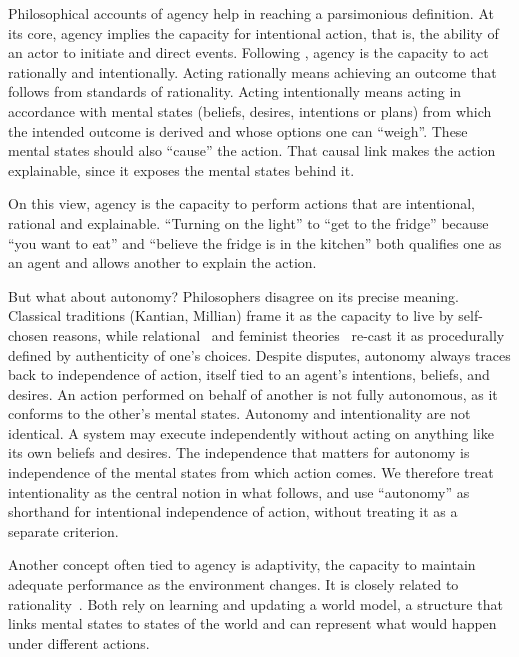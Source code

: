 \documentclass[letterpaper]{article} %
\theoremstyle{definition}
\begin{document}
Philosophical accounts of agency help in reaching a parsimonious definition. At its core, agency implies the capacity for intentional action, that is, the ability of an actor to initiate and direct events. Following \citet{davidsonEssaysActionsEvents1980}, agency is the capacity to act rationally and intentionally. Acting rationally means achieving an outcome that follows from standards of rationality. Acting intentionally means acting in accordance with mental states (beliefs, desires, intentions or plans) from which the intended outcome is derived and whose options one can ``weigh''. These mental states should also ``cause'' the action. That causal link makes the action explainable, since it exposes the mental states behind it.

On this view, agency is the capacity to perform actions that are intentional, rational and explainable. ``Turning on the light'' to ``get to the fridge'' because ``you want to eat'' and ``believe the fridge is in the kitchen'' both qualifies one as an agent and allows another to explain the action.

But what about autonomy? Philosophers disagree on its precise meaning. Classical traditions (Kantian, Millian) frame it as the capacity to live by self-chosen reasons, while relational~\citep{oshanaRelationalAutonomy2020} and feminist theories~\citep{mackenzieFeministConceptionsAutonomy2017} re-cast it as procedurally defined by authenticity of one's choices. Despite disputes, autonomy always traces back to independence of action, itself tied to an agent's intentions, beliefs, and desires. An action performed on behalf of another is not fully autonomous, as it conforms to the other's mental states. Autonomy and intentionality are not identical. A system may execute independently without acting on anything like its own beliefs and desires. The independence that matters for autonomy is independence of the mental states from which action comes. We therefore treat intentionality as the central notion in what follows, and use ``autonomy'' as shorthand for intentional independence of action, without treating it as a separate criterion.

Another concept often tied to agency is adaptivity, the capacity to maintain adequate performance as the environment changes. It is closely related to rationality~\citep{shavitPracticesGoverningAgentic}. Both rely on learning and updating a world model, a structure that links mental states to states of the world and can represent what would happen under different actions.
\end{document}
